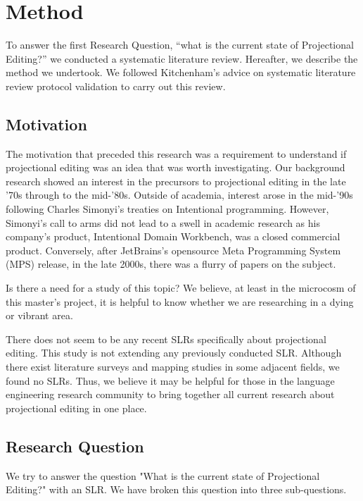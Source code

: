 \section{Method}
\label{section:slr_method}

To answer the first Research Question, ``what is the current state of Projectional Editing?'' we conducted a systematic literature review.
Hereafter, we describe the method we undertook. 
We followed Kitchenham's\cite{kitchenham2015evidence} advice on systematic literature review protocol validation to carry out this review.

\subsection{Motivation}
The motivation that preceded this research was a requirement to understand if projectional editing was an idea that was worth investigating.
Our background research showed an interest in the precursors to projectional editing in the late '70s through to the mid-'80s.
Outside of academia, interest arose in the mid-'90s following Charles Simonyi's treaties on Intentional programming.
However, Simonyi's call to arms did not lead to a swell in academic research as his company's product, Intentional Domain Workbench, was a closed commercial product.
Conversely, after JetBrains's opensource Meta Programming System (MPS) release, in the late 2000s, there was a flurry of papers on the subject.

Is there a need for a study of this topic? 
We believe, at least in the microcosm of this master's project, it is helpful to know whether we are researching in a dying or vibrant area.

There does not seem to be any recent SLRs specifically about projectional editing.
This study is not extending any previously conducted SLR.
Although there exist literature surveys and mapping studies in some adjacent fields, we found no SLRs.
Thus, we believe it may be helpful for those in the language engineering research community to bring together all current research about projectional editing in one place.

\subsection{Research Question}
We try to answer the question "What is the current state of Projectional Editing?" with an SLR. 
We have broken this question into three sub-questions.


